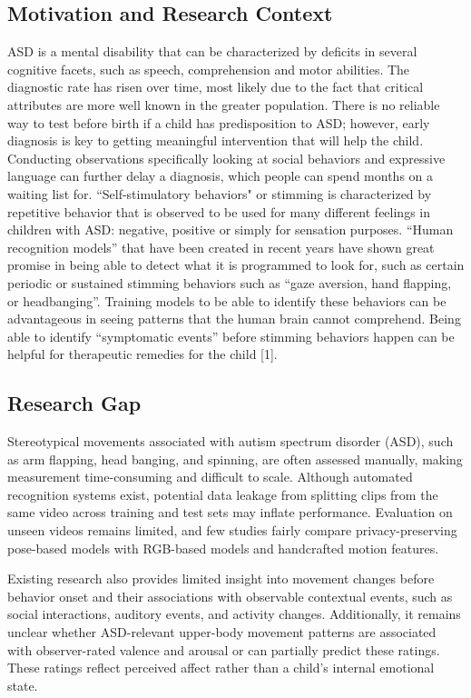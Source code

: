 \documentclass[10pt,twocolumn,letterpaper]{article}
\begin{document}
\subsection{Motivation and Research Context}
ASD is a mental disability that can be characterized by deficits in several cognitive facets, such as speech, comprehension and motor abilities. The diagnostic rate has risen over time, most likely due to the fact that critical attributes are more well known in the greater population. There is no reliable way to test before birth if a child has predisposition to ASD; however, early diagnosis is key to getting meaningful intervention that will help the child. Conducting observations specifically looking at social behaviors and expressive language can further delay a diagnosis, which people can spend months on a waiting list for. “Self-stimulatory behaviors" or stimming is characterized by repetitive behavior that is observed to be used for many different feelings in children with ASD: negative, positive or simply for sensation purposes. “Human recognition models” that have been created in recent years have shown great promise in being able to detect what it is programmed to look for, such as certain periodic or sustained stimming behaviors such as “gaze aversion, hand flapping, or headbanging”. Training models to be able to identify these behaviors can be advantageous in seeing patterns that the human brain cannot comprehend. Being able to identify “symptomatic events” before stimming behaviors happen can be helpful for therapeutic remedies for the child [1].

\subsection{Research Gap}

Stereotypical movements associated with autism spectrum disorder (ASD), such as arm flapping, head banging, and spinning, are often assessed manually, making measurement time-consuming and difficult to scale. Although automated recognition systems exist, potential data leakage from splitting clips from the same video across training and test sets may inflate performance. Evaluation on unseen videos remains limited, and few studies fairly compare privacy-preserving pose-based models with RGB-based models and handcrafted motion features.

Existing research also provides limited insight into movement changes before behavior onset and their associations with observable contextual events, such as social interactions, auditory events, and activity changes. Additionally, it remains unclear whether ASD-relevant upper-body movement patterns are associated with observer-rated valence and arousal or can partially predict these ratings. These ratings reflect perceived affect rather than a child's internal emotional state.
\end{document}
